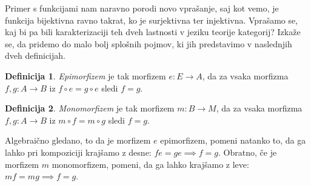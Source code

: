\documentclass[12pt,a4paper]{book}
\theoremstyle{definition}
\newtheorem{definicija}{Definicija}[chapter]
\theoremstyle{plain}
\theoremstyle{definition}
\theoremstyle{remark}
\begin{document}
Primer s funkcijami nam naravno porodi novo vprašanje, saj kot vemo, je funkcija bijektivna ravno takrat, ko je surjektivna ter injektivna. Vprašamo se, kaj bi pa bili karakterizaciji teh dveh lastnosti v jeziku teorije kategorij? Izkaže se, da pridemo do malo bolj splošnih pojmov, ki jih predstavimo v naslednjih dveh definicijah.

\begin{definicija}
\emph{Epimorfizem} je tak morfizem $e : E \to A$, da za vsaka morfizma $f,g : A \to B$ iz $f \circ e = g \circ e$ sledi $f = g$.
\end{definicija}

\begin{definicija}
\emph{Monomorfizem} je tak morfizem $m : B \to M$, da za vsaka morfizma $f,g : A \to B$ iz $m \circ f = m \circ g$ sledi $f = g$.
\end{definicija}

Algebraično gledano, to da je morfizem $e$ epimorfizem, pomeni natanko to, da ga lahko pri kompoziciji krajšamo z desne: $fe = ge \implies f=g$. Obratno, če je morfizem $m$ monomorfizem, pomeni, da ga lahko krajšamo z leve: $mf = mg \implies f = g$.
\end{document}
